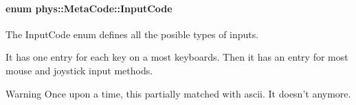 \hypertarget{classphys_1_1MetaCode_a3e501cbb5bf0f6f1fdb7211465bda8d8}{
\paragraph[{InputCode}]{\setlength{\rightskip}{0pt plus 5cm}enum {\bf phys::MetaCode::InputCode}}\hfill}
\label{classphys_1_1MetaCode_a3e501cbb5bf0f6f1fdb7211465bda8d8}


The InputCode enum defines all the posible types of inputs. 

It has one entry for each key on a most keyboards. Then it has an entry for most mouse and joystick input methods. \begin{DoxyWarning}{Warning}
Once upon a time, this partially matched with ascii. It doesn't anymore. 
\end{DoxyWarning}
